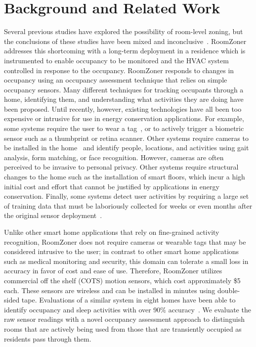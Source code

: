\section{Background and Related Work}
\label{sec:cs2relatedWork}

Several previous studies have explored the possibility of room-level zoning, but
the conclusions of these studies have been mixed and
inconclusive~\cite{walker2003register,watts2007application,Systems2003}. RoomZoner
addresses this shortcoming with a long-term deployment in a residence which is
instrumented to enable occupancy to be monitored and the HVAC system controlled
in response to the occupancy. RoomZoner responds to changes in occupancy using
an occupancy assessment technique that relies on simple occupancy sensors. Many
different techniques for tracking occupants through a home, identifying them,
and understanding what activities they are doing have been proposed. Until
recently, however, existing technologies have all been too expensive or
intrusive for use in energy conservation applications. For example, some systems
require the user to wear a tag~\cite{smith2005rfid}, or to actively trigger a
biometric sensor such as a thumbprint or retina scanner. Other systems require
cameras to be installed in the home~\cite{nait4activity} and identify people,
locations, and activities using gait analysis, form matching, or face
recognition. However, cameras are often perceived to be invasive to personal
privacy. Other systems require structural changes to the home such as the
installation of smart floors, which incur a high initial cost and effort that
cannot be justified by applications in energy conservation. Finally, some
systems detect user activities by requiring a large set of training data that
must be laboriously collected for weeks or even months after the original sensor
deployment~\cite{wilson2005simultaneous}.

Unlike other smart home applications that rely on fine-grained activity
recognition, RoomZoner does not require cameras or wearable tags that may be
considered intrusive to the user; in contrast to other smart home applications
such as medical monitoring and security, this domain can tolerate a small loss
in accuracy in favor of cost and ease of use. Therefore, RoomZoner utilizes
commercial off the shelf (COTS) motion sensors, which cost approximately \$5
each. These sensors are wireless and can be installed in minutes using
double-sided tape. Evaluations of a similar system in eight homes have been able
to identify occupancy and sleep activities with over 90\%
accuracy~\cite{srinivasan2008protecting, srinivasan2010using}. We evaluate the
raw sensor readings with a novel occupancy assessment approach to distinguish
rooms that are actively being used from those that are transiently occupied as
residents pass through them.

